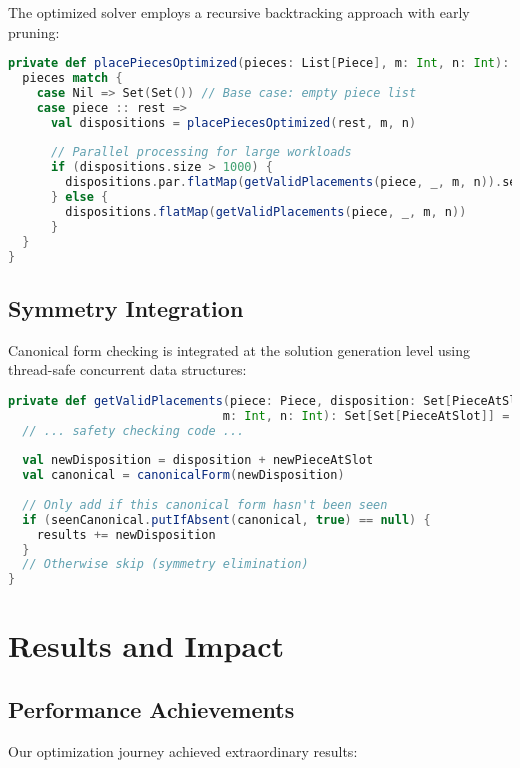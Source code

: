 \documentclass[12pt,a4paper]{article}
\theoremstyle{definition}
\begin{document}
The optimized solver employs a recursive backtracking approach with early pruning:

\begin{lstlisting}[language=Scala, caption=Core Solver Logic]
private def placePiecesOptimized(pieces: List[Piece], m: Int, n: Int): Solutions = {
  pieces match {
    case Nil => Set(Set()) // Base case: empty piece list
    case piece :: rest =>
      val dispositions = placePiecesOptimized(rest, m, n)
      
      // Parallel processing for large workloads
      if (dispositions.size > 1000) {
        dispositions.par.flatMap(getValidPlacements(piece, _, m, n)).seq.toSet
      } else {
        dispositions.flatMap(getValidPlacements(piece, _, m, n))
      }
  }
}
\end{lstlisting}

\subsection{Symmetry Integration}

Canonical form checking is integrated at the solution generation level using thread-safe concurrent data structures:

\begin{lstlisting}[language=Scala, caption=Symmetry-Aware Placement]
private def getValidPlacements(piece: Piece, disposition: Set[PieceAtSlot], 
                              m: Int, n: Int): Set[Set[PieceAtSlot]] = {
  // ... safety checking code ...
  
  val newDisposition = disposition + newPieceAtSlot
  val canonical = canonicalForm(newDisposition)
  
  // Only add if this canonical form hasn't been seen
  if (seenCanonical.putIfAbsent(canonical, true) == null) {
    results += newDisposition
  }
  // Otherwise skip (symmetry elimination)
}
\end{lstlisting}

\section{Results and Impact}

\subsection{Performance Achievements}

Our optimization journey achieved extraordinary results:
\end{document}
